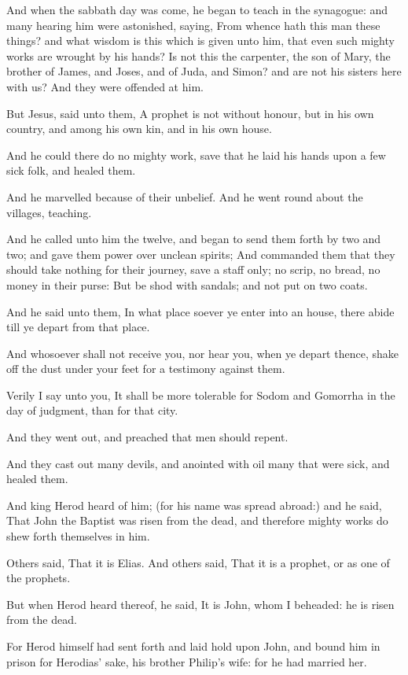 \verse And when the sabbath day was come, he began to teach in the synagogue: and many hearing him were astonished, saying, From whence hath this man these things? and what wisdom is this which is given unto him, that even such mighty works are wrought by his hands?  \verse Is not this the carpenter, the son of Mary, the brother of James, and Joses, and of Juda, and Simon? and are not his sisters here with us?  And they were offended at him.

\verse But Jesus, said unto them, A prophet is not without honour, but in his own country, and among his own kin, and in his own house.

\verse And he could there do no mighty work, save that he laid his hands upon a few sick folk, and healed them.

\verse And he marvelled because of their unbelief. And he went round about the villages, teaching.

\verse And he called unto him the twelve, and began to send them forth by two and two; and gave them power over unclean spirits; \verse And commanded them that they should take nothing for their journey, save a staff only; no scrip, no bread, no money in their purse: \verse But be shod with sandals; and not put on two coats.

\verse And he said unto them, In what place soever ye enter into an house, there abide till ye depart from that place.

\verse And whosoever shall not receive you, nor hear you, when ye depart thence, shake off the dust under your feet for a testimony against them.

Verily I say unto you, It shall be more tolerable for Sodom and Gomorrha in the day of judgment, than for that city.

\verse And they went out, and preached that men should repent.

\verse And they cast out many devils, and anointed with oil many that were sick, and healed them.

\verse And king Herod heard of him; (for his name was spread abroad:) and he said, That John the Baptist was risen from the dead, and therefore mighty works do shew forth themselves in him.

\verse Others said, That it is Elias. And others said, That it is a prophet, or as one of the prophets.

\verse But when Herod heard thereof, he said, It is John, whom I beheaded: he is risen from the dead.

\verse For Herod himself had sent forth and laid hold upon John, and bound him in prison for Herodias' sake, his brother Philip's wife: for he had married her.

